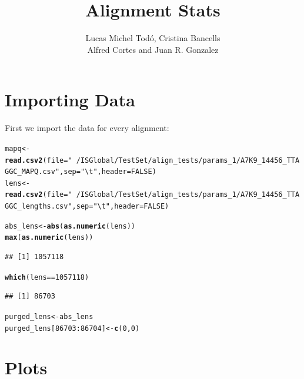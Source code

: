 \documentclass[12pt, a4paper]{article}\usepackage[]{graphicx}\usepackage[]{color}
\title{\textbf{\Large Alignment Stats}}
\author {Lucas Michel Todó, Cristina Bancells\\
Alfred Cortes and Juan R. Gonzalez}
\affil{Barcelona Global Health Institute (ISGlobal), Campus PRBB}
\makeatletter
\newcommand{\hlnum}[1]{\textcolor[rgb]{0.686,0.059,0.569}{#1}}%
\newcommand{\hlstr}[1]{\textcolor[rgb]{0.192,0.494,0.8}{#1}}%
\newcommand{\hlopt}[1]{\textcolor[rgb]{0,0,0}{#1}}%
\newcommand{\hlstd}[1]{\textcolor[rgb]{0.345,0.345,0.345}{#1}}%
\newcommand{\hlkwb}[1]{\textcolor[rgb]{0.69,0.353,0.396}{#1}}%
\newcommand{\hlkwc}[1]{\textcolor[rgb]{0.333,0.667,0.333}{#1}}%
\newcommand{\hlkwd}[1]{\textcolor[rgb]{0.737,0.353,0.396}{\textbf{#1}}}%
\newenvironment{kframe}{%
 \def\at@end@of@kframe{}%
 \ifinner\ifhmode%
  \def\at@end@of@kframe{\end{minipage}}%
  \begin{minipage}{\columnwidth}%
 \fi\fi%
 \def\FrameCommand##1{\hskip\@totalleftmargin \hskip-\fboxsep
 \colorbox{shadecolor}{##1}\hskip-\fboxsep
     \hskip-\linewidth \hskip-\@totalleftmargin \hskip\columnwidth}%
 \MakeFramed {\advance\hsize-\width
   \@totalleftmargin\z@ \linewidth\hsize
   \@setminipage}}%
 {\par\unskip\endMakeFramed%
 \at@end@of@kframe}
\newenvironment{knitrout}{}{} %
\makeatother
\begin{document}
	
\maketitle
\tableofcontents
\newpage



\section{Importing Data}

First we import the data for every alignment:
\begin{knitrout}
\color{fgcolor}\begin{kframe}
\begin{alltt}
\hlstd{mapq} \hlkwb{<-} \hlkwd{read.csv2}\hlstd{(}\hlkwc{file} \hlstd{=} \hlstr{"~/ISGlobal/TestSet/align_tests/params_1/A7K9_14456_TTAGGC_MAPQ.csv"}\hlstd{,} \hlkwc{sep} \hlstd{=} \hlstr{"\textbackslash{}t"}\hlstd{,} \hlkwc{header} \hlstd{=} \hlnum{FALSE}\hlstd{)}
\hlstd{lens} \hlkwb{<-} \hlkwd{read.csv2}\hlstd{(}\hlkwc{file} \hlstd{=} \hlstr{"~/ISGlobal/TestSet/align_tests/params_1/A7K9_14456_TTAGGC_lengths.csv"}\hlstd{,} \hlkwc{sep} \hlstd{=} \hlstr{"\textbackslash{}t"}\hlstd{,} \hlkwc{header} \hlstd{=} \hlnum{FALSE}\hlstd{)}

\hlstd{abs_lens} \hlkwb{<-} \hlkwd{abs}\hlstd{(}\hlkwd{as.numeric}\hlstd{(lens))}
\hlkwd{max}\hlstd{(}\hlkwd{as.numeric}\hlstd{(lens))}
\end{alltt}
\begin{verbatim}
## [1] 1057118
\end{verbatim}
\begin{alltt}
\hlkwd{which}\hlstd{(lens} \hlopt{==} \hlnum{1057118}\hlstd{)}
\end{alltt}
\begin{verbatim}
## [1] 86703
\end{verbatim}
\begin{alltt}
\hlstd{purged_lens} \hlkwb{<-} \hlstd{abs_lens}
\hlstd{purged_lens[}\hlnum{86703}\hlopt{:}\hlnum{86704}\hlstd{]} \hlkwb{<-} \hlkwd{c}\hlstd{(}\hlnum{0}\hlstd{,}\hlnum{0}\hlstd{)}
\end{alltt}
\end{kframe}
\end{knitrout}

\section{Plots}
\end{document}
